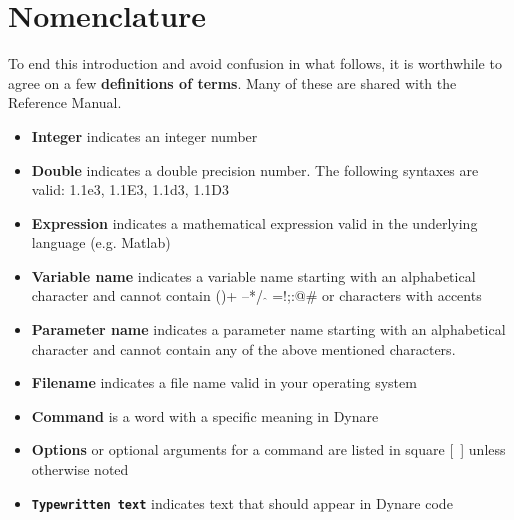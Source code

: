 \section{Nomenclature}
To end this introduction and avoid confusion in what follows, it is worthwhile to agree on a few \textbf{definitions of terms}. Many of these are shared with the Reference Manual. 
\begin{itemize}
\item \textbf{Integer} indicates an integer number
\item \textbf{Double} indicates a double precision number. The following syntaxes are valid: 1.1e3, 1.1E3, 1.1d3, 1.1D3
\item \textbf{Expression} indicates a mathematical expression valid in the underlying language (e.g. Matlab)
\item \textbf{Variable name} indicates a variable name starting with an alphabetical character and cannot contain ()+ --*/ $\hat{}$ =!;:@\# or characters with accents
\item \textbf{Parameter name} indicates a parameter name starting with an alphabetical character and cannot contain any of the above mentioned characters. 
\item \textbf{Filename} indicates a file name valid in your operating system
\item \textbf{Command} is a word with a specific meaning in Dynare
\item \textbf{Options} or optional arguments for a command are listed in square \mbox{[ ]} unless otherwise noted
\item \textbf{\texttt{Typewritten text}} indicates text that should appear in Dynare code

\end{itemize}


 

